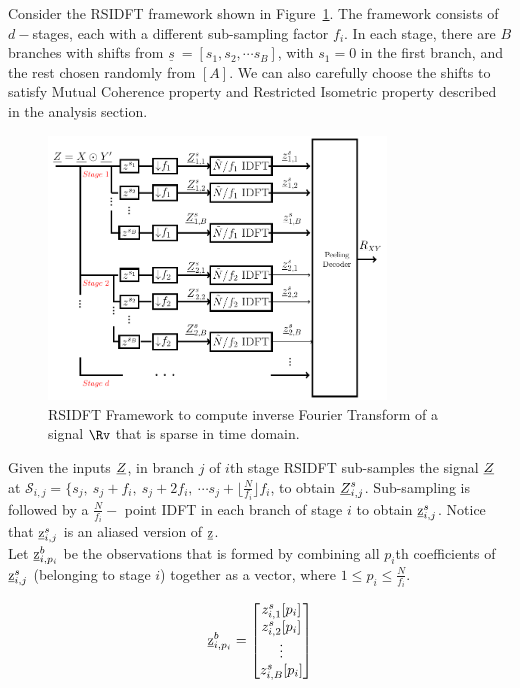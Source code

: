 \begin{enumerate}
	 Consider the RSIDFT framework shown in Figure~\ref{fig:rsidft}. The framework consists of $d-$stages, each with a different sub-sampling factor $f_i$. In each stage, there are $B$ branches with shifts from $\underline{s}\ = [s_1, s_2, \cdots s_B] $, with $s_1 =0$ in the first branch, and the rest chosen randomly from $[A]$. We can also carefully choose the shifts to satisfy Mutual Coherence property and Restricted Isometric property described in the analysis section.
	 
	 \begin{figure}
	 	\begin{center}
	 		\includegraphics[height=7cm]{Figures/FFAST_Robust} 
	 	\end{center}	   
	 	\caption{ RSIDFT Framework to compute inverse Fourier Transform of a signal $\Rv$ that is sparse in time domain. }\label{fig:rsidft}
	\vspace{5 pt}
	 \end{figure}	
	        
	
	 
	 Given the inputs $\underline{Z}$, in branch $j$ of $i$th stage RSIDFT sub-samples the signal $\underline{Z}$ at $\mathcal{S}_{i,j} = \{s_j,\ s_j + f_i,\ s_j + 2f_i,\ \cdots s_j + \lfloor{\frac{N}{f_i} }\rfloor f_i$, to obtain $\underline{Z}^{s}_{i,j}$. Sub-sampling is followed by a $\frac{N}{f_i}-$ point IDFT in each branch of stage $i$ to obtain $ \underline{\mathrm{z}}^{s}_{i,j}$. Notice that $ \underline{\mathrm{z}}^{s}_{i,j}$ is an aliased version of $\underline{\mathrm{z}}$. \\
	 Let $\underline{\mathrm{z}}^{b}_{i,p_i}$ be the observations that is formed by combining all $p_i$th coefficients of $\underline{\mathrm{z}}^{s}_{i,j}$ (belonging to stage $i$) together as a vector, where $1 \leq p_i \leq \frac{N}{f_i}$.
	 
	 \[ \underline{\mathrm{z}}^{b}_{i,p_i} = \begin{bmatrix}
	 z^{s}_{i,1}[p_i] \\
	 z^{s}_{i,2}[p_i] \\
	 \vdots\\
	 z^{s}_{i,B}[p_i]
	 \end{bmatrix}  \]
	 

\end{enumerate}
